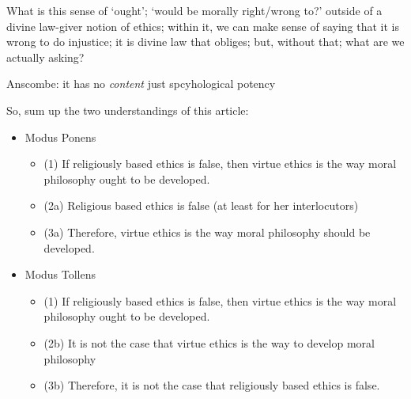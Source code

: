 \documentclass[11pt]{article}
\begin{document}
\noindent What is this sense of `ought'; `would be morally right/wrong to?' outside of a divine law-giver notion of ethics; within it, we can make sense of saying that it is wrong to do injustice; it is divine law that obliges; but, without that; what are we actually asking?
\vspace*{2mm}

\noindent Anscombe: it has no \emph{content} just spcyhological potency
\vspace*{2mm}

\noindent So, sum up the two understandings of this article:

\begin{itemize}\item{Modus Ponens}\begin{itemize}\item{(1) If religiously based ethics is false, then virtue ethics is the way moral philosophy ought to be developed.}\item{(2a) Religious based ethics is false (at least for her interlocutors)}\item{(3a) Therefore, virtue ethics is the way moral philosophy should be developed.}\end{itemize}\item{Modus Tollens}\begin{itemize}\item{(1) If religiously based ethics is false, then virtue ethics is the way moral philosophy ought to be developed.}\item{(2b)	It is not the case that virtue ethics is the way to develop moral philosophy}\item{(3b) Therefore, it is not the case that religiously based ethics is false.}\end{itemize}\end{itemize}
\end{document}
